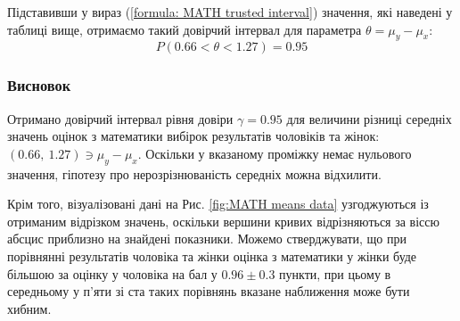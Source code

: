 Підставивши у вираз (\ref{formula: MATH trusted interval}) значення, які наведені у таблиці вище, отримаємо такий довірчий 
інтервал для параметра $\theta=\mu_y-\mu_x$:
\begin{equation*}
    P(0.66 < \theta < 1.27)=0.95
\end{equation*}

\newpage
\subsubsection*{Висновок}

Отримано довірчий інтервал рівня довіри $\gamma=0.95$ для величини різниці середніх значень 
оцінок з математики вибірок результатів чоловіків та жінок: $(0.66,\ 1.27)\ni \mu_y-\mu_x$. Оскільки 
у вказаному проміжку немає нульового значення, гіпотезу про нерозрізнюваність середніх можна відхилити. 

Крім того, візуалізовані дані на Рис. \ref{fig:MATH means data} узгоджуються із отриманим відрізком значень, 
оскільки вершини кривих відрізняються за віссю абсцис приблизно на знай\-дені показники. Можемо стверджувати, 
що при порівнянні результатів чоловіка та жінки оцінка з математики у жінки буде більшою за оцінку у 
чоловіка на бал у $0.96\pm 0.3$ пункти, при цьому в середньому у п'яти зі ста таких порівнянь вказане 
наближення може бути хибним.
